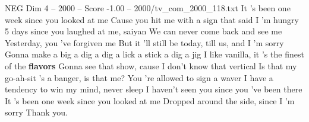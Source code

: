 \begin{textsample}{NEG Dim 4 – 2000 – Score -1.00 – 2000/tv\_com\_2000\_118.txt}  \label{ex:f4_neg_028}
It 's been one week since you looked at me Cause you hit me with a sign that said I 'm hungry 5 days since you laughed at me, saiyan We can never come back and see me Yesterday, you 've forgiven me But it 'll still be today, till us, and I 'm sorry Gonna make a big a dig a dig a lick a stick a dig a jig I like vanilla, it 's the finest of the \textbf{flavors} Gonna see that show, cause I don't know that vertical Is that my go-ah-sit 's a banger, is that me?
You 're allowed to sign a waver I have a tendency to win my mind, never sleep I haven't seen you since you 've been there It 's been one week since you looked at me Dropped around the side, since I 'm sorry Thank you.

\end{textsample}
